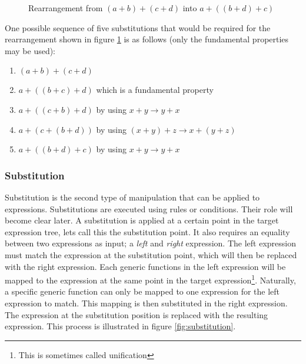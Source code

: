 \documentclass{article}
\begin{document}
\begin{figure}
\centering
{}
\caption{Rearrangement from $(a+b)+(c+d)$ into $a+((b+d)+c)$} \label{fig:rearrange}
\end{figure}

\pagebreak
One possible sequence of five substitutions that would be required for the rearrangement shown in figure \ref{fig:rearrange} is as follows (only the fundamental properties may be used):
\begin{enumerate}
\item $(a+b)+(c+d)$
\item $a+((b+c)+d)$ which is a fundamental property
\item $a+((c+b)+d)$ by using $x+y\rightarrow y+x$
\item $a+(c+(b+d))$ by using $(x+y)+z\rightarrow x+(y+z)$
\item $a+((b+d)+c)$ by using $x+y\rightarrow y+x$
\end{enumerate}

\subsubsection{Substitution}
\label{section:substitution}
Substitution is the second type of manipulation that can be applied to expressions. Substitutions are executed using rules or conditions. Their role will become clear later. A substitution is applied at a certain point in the target expression tree, lets call this the substitution point. It also requires an equality between two expressions as input; a \emph{left} and \emph{right} expression. The left expression must match the expression at the substitution point, which will then be replaced with the right expression. Each generic functions in the left expression will be mapped to the expression at the same point in the target expression\footnote{This is sometimes called unification}. Naturally, a specific generic function can only be mapped to one expression for the left expression to match. This mapping is then substituted in the right expression. The expression at the substitution position is replaced with the resulting expression. This process is illustrated in figure \ref{fig:substitution}. 
\end{document}
